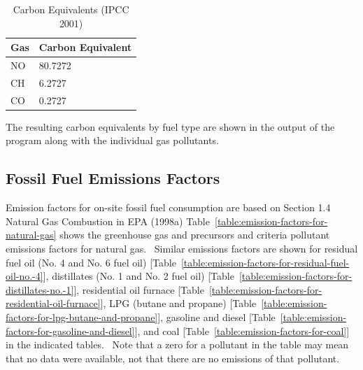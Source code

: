 \begin{longtable}[c]{@{}ll@{}}
\caption{Carbon Equivalents (IPCC 2001) \protect \label{table:carbon-equivalents-ipcc-2001}}\\
\toprule 
Gas & Carbon Equivalent \tabularnewline \midrule
\endhead
NO & 80.7272 \tabularnewline
CH & 6.2727 \tabularnewline
CO & 0.2727 \tabularnewline
\bottomrule
\end{longtable}

The resulting carbon equivalents by fuel type are shown in the output of the program along with the individual gas pollutants.

\subsection{Fossil Fuel Emissions Factors}\label{fossil-fuel-emissions-factors}

Emission factors for on-site fossil fuel consumption are based on Section 1.4 Natural Gas Combustion in EPA (1998a) Table~\ref{table:emission-factors-for-natural-gas} shows the greenhouse gas and precursors and criteria pollutant emissions factors for natural gas.~ Similar emissions factors are shown for residual fuel oil (No. 4 and No. 6 fuel oil) {[}Table~\ref{table:emission-factors-for-residual-fuel-oil-no.-4}{]}, distillates (No. 1 and No. 2 fuel oil) {[}Table~\ref{table:emission-factors-for-distillates-no.-1}{]}, residential oil furnace {[}Table~\ref{table:emission-factors-for-residential-oil-furnace}{]}, LPG (butane and propane) {[}Table~\ref{table:emission-factors-for-lpg-butane-and-propane}{]}, gasoline and diesel {[}Table~\ref{table:emission-factors-for-gasoline-and-diesel}{]}, and coal {[}Table~\ref{table:emission-factors-for-coal}{]} in the indicated tables.~ Note that a zero for a pollutant in the table may mean that no data were available, not that there are no emissions of that pollutant.

